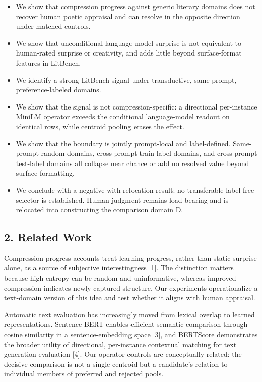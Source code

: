 \documentclass[
]{article}
\begin{document}
\begin{itemize}
\item
  We show that compression progress against generic literary domains
  does not recover human poetic appraisal and can resolve in the
  opposite direction under matched controls.
\item
  We show that unconditional language-model surprise is not equivalent
  to human-rated surprise or creativity, and adds little beyond
  surface-format features in LitBench.
\item
  We identify a strong LitBench signal under transductive, same-prompt,
  preference-labeled domains.
\item
  We show that the signal is not compression-specific: a directional
  per-instance MiniLM operator exceeds the conditional language-model
  readout on identical rows, while centroid pooling erases the effect.
\item
  We show that the boundary is jointly prompt-local and label-defined.
  Same-prompt random domains, cross-prompt train-label domains, and
  cross-prompt test-label domains all collapse near chance or add no
  resolved value beyond surface formatting.
\item
  We conclude with a negative-with-relocation result: no transferable
  label-free selector is established. Human judgment remains
  load-bearing and is relocated into constructing the comparison domain
  D.
\end{itemize}

\subsection{2. Related Work}\label{related-work}

Compression-progress accounts treat learning progress, rather than
static surprise alone, as a source of subjective interestingness
{[}1{]}. The distinction matters because high entropy can be random and
uninformative, whereas improved compression indicates newly captured
structure. Our experiments operationalize a text-domain version of this
idea and test whether it aligns with human appraisal.

Automatic text evaluation has increasingly moved from lexical overlap to
learned representations. Sentence-BERT enables efficient semantic
comparison through cosine similarity in a sentence-embedding space
{[}3{]}, and BERTScore demonstrates the broader utility of directional,
per-instance contextual matching for text generation evaluation {[}4{]}.
Our operator controls are conceptually related: the decisive comparison
is not a single centroid but a candidate's relation to individual
members of preferred and rejected pools.
\end{document}
